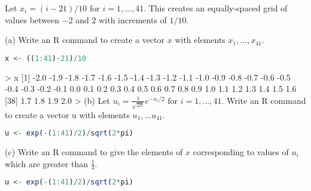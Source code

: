 \documentclass[boxes, qed]{homework}
\begin{document}
\newenvironment{amatrix}[1]{%
  \left[\begin{array}{@{}*{#1}{c}|c@{}}
}{%
  \end{array}\right]
}

\newenvironment{augmatrix}[1]{%
  \left[\begin{array}{#1}
}{%
  \end{array}\right]
}

\begin{problem}Let $x_i=(i - 21)/10$ for $i = 1,\dots, 41$.
  This creates an equally-spaced grid of values between
  $-2$ and $2$ with increments of $1/10$.
\end{problem}
\begin{solution}
  (a) Write an R command to create a vector $x$ with 
  elements $x_1, . . . , x_{41}$.
  \begin{lstlisting}[backgroundcolor = \color{lightgray},language = R]
    x <- ((1:41)-21)/10
  \end{lstlisting}
  > x
  [1] -2.0 -1.9 -1.8 -1.7 -1.6 -1.5 -1.4 -1.3 -1.2 -1.1 -1.0 -0.9 -0.8 -0.7 -0.6 -0.5 -0.4 -0.3 -0.2 -0.1  0.0  0.1  0.2  0.3  0.4  0.5  0.6  0.7  0.8  0.9  1.0  1.1  1.2  1.3  1.4  1.5  1.6
  [38]  1.7  1.8  1.9  2.0
  > 
  (b) Let $u_i = \frac{1}{\sqrt{2\pi}}e^{-x_i/2}$
  for $i = 1, . . . , 41$. Write an R command to create a vector u with elements
  $u_1, . . . u_{41}$.
  \begin{lstlisting}[backgroundcolor = \color{lightgray},
    language = R,
    xleftmargin = 2cm,
    framexleftmargin = 1em]
    u <- exp(-(1:41)/2)/sqrt(2*pi)
  \end{lstlisting}
  (c) Write an R command to give the elements of $x$
  corresponding to values of $u_i$ which are greater
  than $\frac{1}{4}$.
  \begin{lstlisting}[backgroundcolor = \color{lightgray},
    language = R,
    xleftmargin = 2cm,
    framexleftmargin = 1em]
    u <- exp(-(1:41)/2)/sqrt(2*pi)
  \end{lstlisting}
\end{solution}
\end{document}
